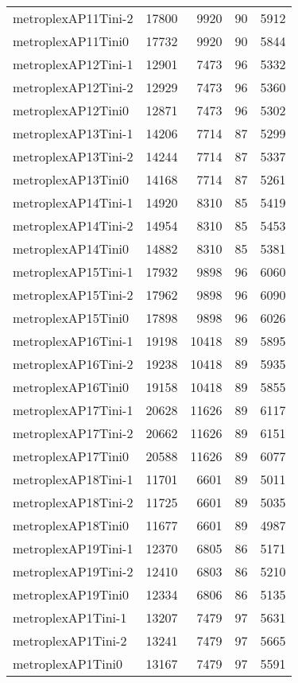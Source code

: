 \documentclass[../../../thesis.tex]{subfiles}
\begin{document}
\begin{longtable}{lrrrr}
metroplexAP11Tini-2 & 17800 & 9920 & 90 & 5912 \\
metroplexAP11Tini0 & 17732 & 9920 & 90 & 5844 \\
metroplexAP12Tini-1 & 12901 & 7473 & 96 & 5332 \\
metroplexAP12Tini-2 & 12929 & 7473 & 96 & 5360 \\
metroplexAP12Tini0 & 12871 & 7473 & 96 & 5302 \\
metroplexAP13Tini-1 & 14206 & 7714 & 87 & 5299 \\
metroplexAP13Tini-2 & 14244 & 7714 & 87 & 5337 \\
metroplexAP13Tini0 & 14168 & 7714 & 87 & 5261 \\
metroplexAP14Tini-1 & 14920 & 8310 & 85 & 5419 \\
metroplexAP14Tini-2 & 14954 & 8310 & 85 & 5453 \\
metroplexAP14Tini0 & 14882 & 8310 & 85 & 5381 \\
metroplexAP15Tini-1 & 17932 & 9898 & 96 & 6060 \\
metroplexAP15Tini-2 & 17962 & 9898 & 96 & 6090 \\
metroplexAP15Tini0 & 17898 & 9898 & 96 & 6026 \\
metroplexAP16Tini-1 & 19198 & 10418 & 89 & 5895 \\
metroplexAP16Tini-2 & 19238 & 10418 & 89 & 5935 \\
metroplexAP16Tini0 & 19158 & 10418 & 89 & 5855 \\
metroplexAP17Tini-1 & 20628 & 11626 & 89 & 6117 \\
metroplexAP17Tini-2 & 20662 & 11626 & 89 & 6151 \\
metroplexAP17Tini0 & 20588 & 11626 & 89 & 6077 \\
metroplexAP18Tini-1 & 11701 & 6601 & 89 & 5011 \\
metroplexAP18Tini-2 & 11725 & 6601 & 89 & 5035 \\
metroplexAP18Tini0 & 11677 & 6601 & 89 & 4987 \\
metroplexAP19Tini-1 & 12370 & 6805 & 86 & 5171 \\
metroplexAP19Tini-2 & 12410 & 6803 & 86 & 5210 \\
metroplexAP19Tini0 & 12334 & 6806 & 86 & 5135 \\
metroplexAP1Tini-1 & 13207 & 7479 & 97 & 5631 \\
metroplexAP1Tini-2 & 13241 & 7479 & 97 & 5665 \\
metroplexAP1Tini0 & 13167 & 7479 & 97 & 5591 \\

\end{longtable}
\end{document}
